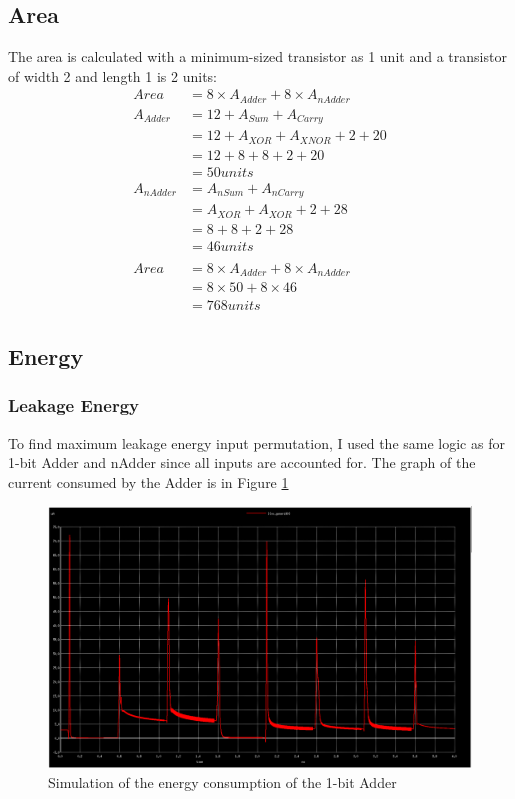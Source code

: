 \documentclass{article}
\begin{document}
\subsection{Area}
The area is calculated with a minimum-sized transistor as 1 unit and a transistor of width 2 and length 1 is 2 units:
\begin{align*}
Area &= 8 \times A_{Adder} + 8 \times A_{nAdder}\\
A_{Adder} &= 12 + A_{Sum} + A_{Carry}\\
&= 12 + A_{XOR} + A_{XNOR} + 2 + 20\\
&= 12 + 8 + 8 + 2 + 20\\
&= 50units\\
A_{nAdder} &= A_{nSum} + A_{nCarry}\\
&= A_{XOR} + A_{XOR} + 2 + 28\\
&= 8 + 8 + 2 + 28\\
&= 46units\\
\\
Area &= 8 \times A_{Adder} + 8 \times A_{nAdder}\\
&= 8 \times 50 + 8 \times 46\\
&= 768units
\end{align*}

\subsection{Energy}
\subsubsection{Leakage Energy}
To find maximum leakage energy input permutation, I used the same logic as for 1-bit Adder and nAdder since all inputs are accounted for. The graph of the current consumed by the Adder is in Figure \ref{fig:energy_adder_waveform}

\begin{figure}[H]
  \includegraphics[width=\linewidth]{opt_screenshots/energy_adder_waveform.png}
  \caption{Simulation of the energy consumption of the 1-bit Adder}
  \label{fig:energy_adder_waveform}
\end{figure}
\end{document}
